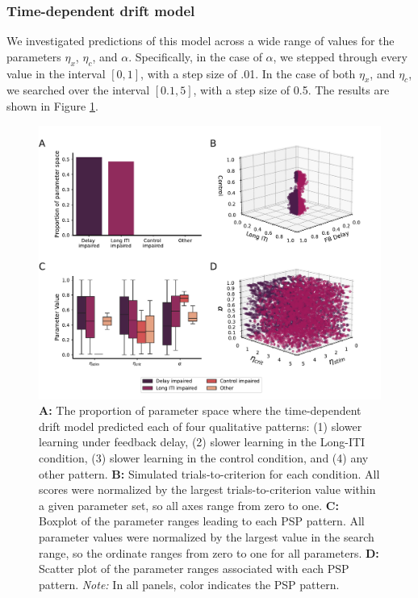 \documentclass[doc, floatsintext]{apa7}
\begin{document}
\subsubsection{Time-dependent drift model}
We investigated predictions of this model across a wide
range of values for the parameters $\eta_{x}$, $\eta_{c}$,
and $\alpha$. Specifically, in the case of $\alpha$,  we
stepped through every value in the interval $[0, 1]$, with a
step size of .01. In the case of both $\eta_{x}$, and
$\eta_{c}$, we searched over the interval $[0.1, 5]$, with a
step size of 0.5. The results are shown in Figure
\ref{fig:TDD_results}. 

\begin{figure} \centering
  \includegraphics[width=1\textwidth]{../figures/model_working_memory.pdf}
  \caption{ 
      \textbf{A:} The proportion of parameter space where
      the time-dependent drift model predicted each of four
      qualitative patterns: (1) slower learning under
      feedback delay, (2) slower learning in the Long-ITI
      condition, (3) slower learning in the control
      condition, and (4) any other pattern. 
      \textbf{B:} Simulated trials-to-criterion for each
      condition. All scores were normalized by the largest
      trials-to-criterion value within a given parameter
      set, so all axes range from zero to one. 
      \textbf{C:} Boxplot of the parameter ranges leading to
      each PSP pattern. All parameter values were normalized
      by the largest value in the search range, so the
      ordinate ranges from zero to one for all parameters.
      \textbf{D:} Scatter plot of the parameter ranges
      associated with each PSP pattern. 
      \textit{Note:} In all panels, color indicates the PSP
      pattern.
}
  \label{fig:TDD_results}
\end{figure}
\end{document}
